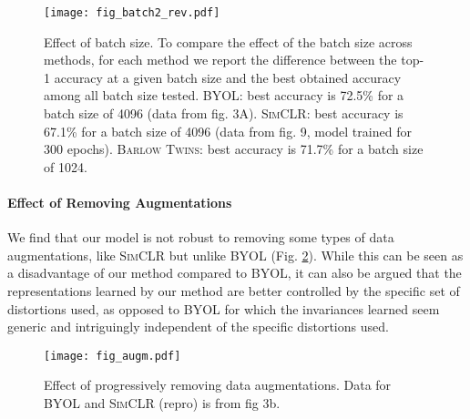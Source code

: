 \documentclass{article}
\newcommand{\AlgoName}{\textsc{Barlow Twins}}
\begin{document}
\begin{figure}[h!]
\vskip 0.2in
\begin{center}
\centerline{\texttt{[image: fig\_batch2\_rev.pdf]}}
\caption{Effect of batch size. To compare the effect of the batch size across methods, for each method we report the difference between the top-1 accuracy at a given batch size and the best obtained accuracy among all batch size tested. \textsc{BYOL}: best accuracy is 72.5\% for a batch size of 4096 (data from \cite{grill2020bootstrap}  fig. 3A). \textsc{SimCLR}: best accuracy is 67.1\% for a batch size of 4096 (data from \cite{chen2020simple} fig. 9, model trained for 300 epochs). \AlgoName{}: best accuracy is 71.7\% for a batch size of 1024.}
\label{fig:fig_batch}
\end{center}
\vskip -0.2in
\end{figure}

\paragraph{Effect of Removing Augmentations} 
We find that our model is not robust to removing some types of data augmentations, like \textsc{SimCLR} but unlike \textsc{BYOL} (Fig. \ref{fig:fig_augm}).  While this can be seen as a disadvantage of our method compared to \textsc{BYOL}, it can also be argued that the representations learned by our method are better controlled by the specific set of distortions used, as opposed to \textsc{BYOL} for which the invariances learned seem generic and intriguingly independent of the specific distortions used.


\begin{figure}[h!]
\vskip 0.2in
\begin{center}
\centerline{\texttt{[image: fig\_augm.pdf]}}
\caption{Effect of progressively removing data augmentations. Data for \textsc{BYOL} and \textsc{SimCLR} (repro) is from \cite{grill2020bootstrap} fig 3b. }
\label{fig:fig_augm}
\end{center}
\vskip -0.2in
\end{figure}
\end{document}
